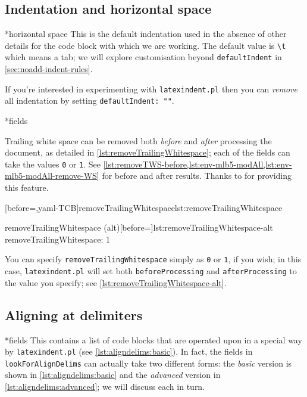 
\subsection{Indentation and horizontal space}
*{horizontal space}
	This is the default indentation used in the absence of other details for the code block
	with which we are working. The default value is \lstinline!\t! which means a tab; we will
	explore customisation beyond \texttt{defaultIndent} in \vref{sec:noadd-indent-rules}.

	If you're interested in experimenting with \texttt{latexindent.pl} then you can
	\emph{remove} all indentation by setting \texttt{defaultIndent: ""}.

*{fields}\label{yaml:removeTrailingWhitespace}

	Trailing white space can be removed both \emph{before} and \emph{after} processing the
	document, as detailed in \cref{lst:removeTrailingWhitespace}; each of the fields can take
	the values \texttt{0} or \texttt{1}. See
	\vref{lst:removeTWS-before,lst:env-mlb5-modAll,lst:env-mlb5-modAll-remove-WS} for before
	and after results. Thanks to \cite{vosskuhle} for providing this feature.

	\begin{minipage}{.4\textwidth}
		[before=\centering,yaml-TCB]{removeTrailingWhitespace}{lst:removeTrailingWhitespace}
	\end{minipage}%
	\hfill
	\begin{minipage}{.5\textwidth}
		\begin{yaml}[numbers=none]{removeTrailingWhitespace (alt)}[before=\centering]{lst:removeTrailingWhitespace-alt}
removeTrailingWhitespace: 1
\end{yaml}
	\end{minipage}%

	You can specify \texttt{removeTrailingWhitespace} simply as \texttt{0} or \texttt{1}, if
	you wish; in this case, 
	\texttt{latexindent.pl} will set both \texttt{beforeProcessing} and
	\texttt{afterProcessing} to the value you specify; see
	\cref{lst:removeTrailingWhitespace-alt}.%

\subsection{Aligning at delimiters}
*{fields}
	This contains a list of code blocks that are operated upon in a special way by
	\texttt{latexindent.pl} (see \cref{lst:aligndelims:basic}). In fact, the fields in
	\texttt{lookForAlignDelims} can actually take two different forms: the \emph{basic}
	version is shown in \cref{lst:aligndelims:basic} and the \emph{advanced} version in
	\cref{lst:aligndelims:advanced}; we will discuss each in turn. 

